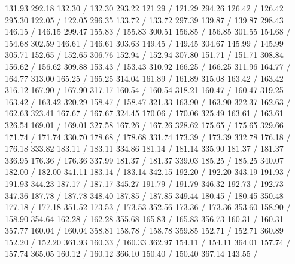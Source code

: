 { 131.93 292.18 132.30 /
 132.30 293.22 121.29 /
 121.29 294.26 126.42 /
 126.42 295.30 122.05 /
 122.05 296.35 133.72 /
 133.72 297.39 139.87 /
 139.87 298.43 146.15 /
 146.15 299.47 155.83 /
 155.83 300.51 156.85 /
 156.85 301.55 154.68 /
 154.68 302.59 146.61 /
 146.61 303.63 149.45 /
 149.45 304.67 145.99 /
 145.99 305.71 152.65 /
 152.65 306.76 152.94 /
 152.94 307.80 151.71 /
 151.71 308.84 156.62 /
 156.62 309.88 153.43 /
 153.43 310.92 166.25 /
 166.25 311.96 164.77 /
 164.77 313.00 165.25 /
 165.25 314.04 161.89 /
 161.89 315.08 163.42 /
 163.42 316.12 167.90 /
 167.90 317.17 160.54 /
 160.54 318.21 160.47 /
 160.47 319.25 163.42 /
 163.42 320.29 158.47 /
 158.47 321.33 163.90 /
 163.90 322.37 162.63 /
 162.63 323.41 167.67 /
 167.67 324.45 170.06 /
 170.06 325.49 163.61 /
 163.61 326.54 169.01 /
 169.01 327.58 167.26 /
 167.26 328.62 175.65 /
 175.65 329.66 171.74 /
 171.74 330.70 178.68 /
 178.68 331.74 173.39 /
 173.39 332.78 176.18 /
 176.18 333.82 183.11 /
 183.11 334.86 181.14 /
 181.14 335.90 181.37 /
 181.37 336.95 176.36 /
 176.36 337.99 181.37 /
 181.37 339.03 185.25 /
 185.25 340.07 182.00 /
 182.00 341.11 183.14 /
 183.14 342.15 192.20 /
 192.20 343.19 191.93 /
 191.93 344.23 187.17 /
 187.17 345.27 191.79 /
 191.79 346.32 192.73 /
 192.73 347.36 187.78 /
 187.78 348.40 187.85 /
 187.85 349.44 180.45 /
 180.45 350.48 177.18 /
 177.18 351.52 173.53 /
 173.53 352.56 173.36 /
 173.36 353.60 158.90 /
 158.90 354.64 162.28 /
 162.28 355.68 165.83 /
 165.83 356.73 160.31 /
 160.31 357.77 160.04 /
 160.04 358.81 158.78 /
 158.78 359.85 152.71 /
 152.71 360.89 152.20 /
 152.20 361.93 160.33 /
 160.33 362.97 154.11 /
 154.11 364.01 157.74 /
 157.74 365.05 160.12 /
 160.12 366.10 150.40 /
 150.40 367.14 143.55 /
}
